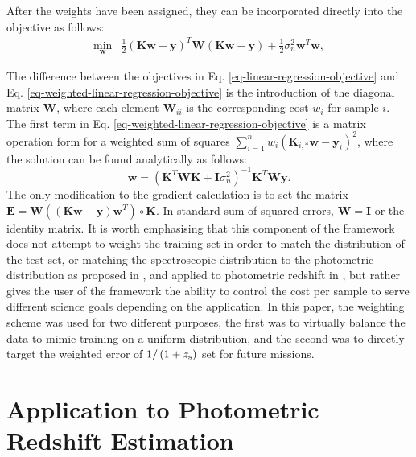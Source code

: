 \documentclass[useAMS,usenatbib,fleqn]{mn2e}
\begin{document}
After the weights have been assigned, they can be incorporated directly into the objective as follows:
\begin{equation}
\label{eq-weighted-linear-regression-objective}
\begin{array}{lcl}
\underset{\mathbf{w}}{\text{min}} &\frac{1}{2}\left ( \mathbf{K}\mathbf{w}-\mathbf{y} \right )^{T} \mathbf{W}\left( \mathbf{K}\mathbf{w}-\mathbf{y} \right )+\frac{1}{2}\sigma_{n}^{2}\mathbf{w}^{T}\mathbf{w},
\end{array}
\end{equation}

The difference between the objectives in Eq. \eqref{eq-linear-regression-objective} and Eq. \eqref{eq-weighted-linear-regression-objective} is the introduction of the diagonal matrix $\mathbf{W}$, where each element $\mathbf{W}_{ii}$ is the corresponding cost $w_{i}$ for sample $i$. The first term in Eq. \eqref{eq-weighted-linear-regression-objective} is a matrix operation form for a weighted sum of squares $\sum_{i=1}^{n}w_{i}\left(\mathbf{K}_{i,*}\mathbf{w}-\mathbf{y}_{i}\right)^{2}$, where the solution can be found analytically as follows:
\begin{equation}
\label{eq-weighted-linear-regression-objective-rectangular}
\mathbf{w} = \left(\mathbf{K}^{T}\mathbf{WK}+\mathbf{I}\sigma_{n}^{2} \right)^{-1}\mathbf{K}^{T}\mathbf{W}\mathbf{y}.
\end{equation}
The only modification to the gradient calculation is to set the matrix $\mathbf{E}=\mathbf{W}\left(\left(\mathbf{K}\mathbf{w}-\mathbf{y}\right)\mathbf{w}^{T}\right)\circ\mathbf{K}$. In standard sum of squared errors, $ \mathbf{W}= \mathbf{I}$ or the identity matrix. It is worth emphasising that this component of the framework does not attempt to weight the training set in order to match the distribution of the test set, or matching the spectroscopic distribution to the photometric distribution as proposed in \citet{Lima2008}, \citet{Cunha2009} and applied to photometric redshift in \citet{sanchez14}, but rather gives the user of the framework the ability to control the cost per sample to serve different science goals depending on the application. In this paper, the weighting scheme was used for two different purposes, the first was to virtually balance the data to mimic training on a uniform distribution, and the second was to directly target the weighted error of $1/\left(1+z_{\rm s}\right)$ set for future missions.

\section{Application to Photometric Redshift Estimation}
\label{sec-application}
\end{document}
